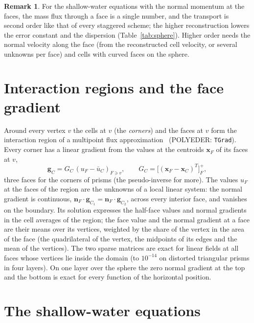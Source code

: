 \documentclass[preprint,12pt]{elsarticle}
\newcommand{\bn}{\mathbf{n}}
\newcommand{\bx}{\mathbf{x}}
\newcommand{\code}[1]{\texttt{#1}}
\theoremstyle{definition}
\newtheorem{remark}{Remark}
\begin{document}
\begin{remark}
For the shallow-water equations with the normal momentum at the faces, the mass flux through a face is
a single number, and the transport is second order like that of every staggered scheme; the higher
reconstruction lowers the error constant and the dispersion (Table~\ref{tab:sphere}). Higher order needs
the normal velocity along the face (from the reconstructed cell velocity, or several unknowns per face)
and cells with curved faces on the sphere.
\end{remark}

\section{Interaction regions and the face gradient}\label{sec:mpfa}

Around every vertex $v$ the cells at $v$ (the \emph{corners}) and the faces at $v$ form the
interaction region of a multipoint flux approximation~\cite{Aavatsmark2002} (POLYEDER: \code{TGrad}).
Every corner has a linear gradient from the values at the centroids $\bx_F$ of its faces at $v$,
\begin{equation}
\mathbf g_C = G_C\,(u_F-\bar u_C)_{F\ni v},\qquad G_C = \big[(\bx_F-\bx_C)^T\big]_F^{+},
\end{equation}
three faces for the corners of prisms (the pseudo-inverse for more). The values $u_F$ at the faces of
the region are the unknowns of a local linear system: the normal gradient is continuous,
$\bn_F\cdot\mathbf g_{C_1}=\bn_F\cdot\mathbf g_{C_2}$, across every interior face, and vanishes on the
boundary. Its solution expresses the half-face values and normal gradients in the cell averages of
the region; the face value and the normal gradient at a face are their means over its vertices,
weighted by the share of the vertex in the area of the face (the quadrilateral of the vertex, the
midpoints of its edges and the mean of the vertices). The two sparse matrices are exact for linear
fields at all faces whose vertices lie inside the domain (to $10^{-14}$ on distorted triangular prisms
in four layers). On one layer over the sphere the zero normal gradient at the top and the bottom is
exact for every function of the horizontal position.

\section{The shallow-water equations}\label{sec:sw}
\end{document}
